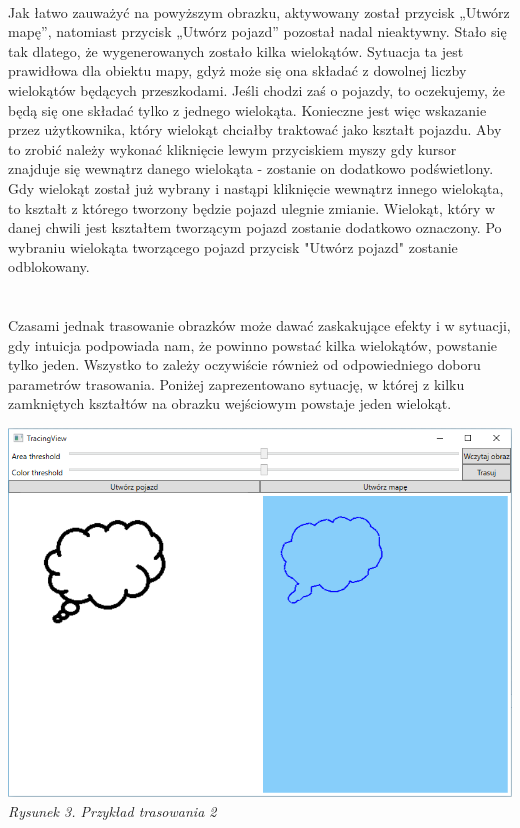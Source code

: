 \documentclass{article}
\begin{document}
~\\Jak łatwo zauważyć na powyższym obrazku, aktywowany został przycisk „Utwórz mapę”, natomiast przycisk „Utwórz pojazd” pozostał nadal nieaktywny. Stało się tak dlatego, że wygenerowanych zostało kilka wielokątów. Sytuacja ta jest prawidłowa dla obiektu mapy, gdyż może się ona składać z dowolnej liczby wielokątów będących przeszkodami. Jeśli chodzi zaś o pojazdy, to oczekujemy, że będą się one składać tylko z jednego wielokąta. Konieczne jest więc wskazanie przez użytkownika, który wielokąt chciałby traktować jako kształt pojazdu. Aby to zrobić należy wykonać kliknięcie lewym przyciskiem myszy gdy kursor znajduje się wewnątrz danego wielokąta - zostanie on dodatkowo podświetlony. Gdy wielokąt został już wybrany i nastąpi kliknięcie wewnątrz innego wielokąta, to kształt z którego tworzony będzie pojazd ulegnie zmianie. Wielokąt, który w danej chwili jest kształtem tworzącym pojazd zostanie dodatkowo oznaczony. Po wybraniu wielokąta tworzącego pojazd przycisk "Utwórz pojazd" zostanie odblokowany.
\\\\\\Czasami jednak trasowanie obrazków może dawać zaskakujące efekty i w sytuacji, gdy intuicja podpowiada nam, że powinno powstać kilka wielokątów, powstanie tylko jeden. Wszystko to zależy oczywiście również od odpowiedniego doboru parametrów trasowania. Poniżej zaprezentowano  sytuację, w której z kilku zamkniętych kształtów na obrazku wejściowym powstaje jeden wielokąt.
~\\\begin{center}
	\includegraphics[scale=0.58]{tracingview3}\\
	\textit{Rysunek 3. Przykład trasowania 2}
\end{center}
\end{document}
